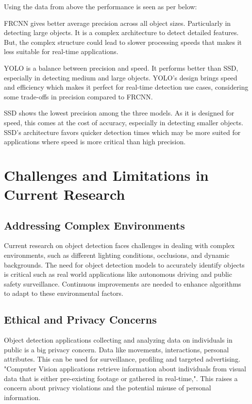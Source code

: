 \documentclass[11pt,journal,compsoc]{IEEEtran}
\begin{document}
Using the data from above the performance is seen as per below:

FRCNN gives better average precision across all object sizes. Particularly in detecting large objects. It is a complex architecture to detect detailed features. But, the complex structure could lead to slower processing speeds that makes it less suitable for real-time applications.

YOLO is a balance between precision and speed. It performs better than SSD, especially in detecting medium and large objects. YOLO's design brings speed and efficiency which makes it perfect for real-time detection use cases, considering some trade-offs in precision compared to FRCNN.

SSD shows the lowest precision among the three models. As it is designed for speed, this comes at the cost of accuracy, especially in detecting smaller objects. SSD's architecture favors quicker detection times which may be more suited for applications where speed is more critical than high precision.


\section{Challenges and Limitations in Current Research}
\subsection{Addressing Complex Environments}
Current research on object detection faces challenges in dealing with complex environments, such as different lighting conditions, occlusions, and dynamic backgrounds\cite{article_limitations}. The need for object detection models to accurately identify objects is critical such as real world applications like autonomous driving and public safety surveillance. Continuous improvements are needed to enhance algorithms to adapt to these environmental factors.

\subsection{Ethical and Privacy Concerns}
Object detection applications collecting and analyzing data on individuals in public is a big privacy concern. Data like movements, interactions, personal attributes. This can be used for surveillance, profiling and targeted advertising. "Computer Vision applications retrieve information about individuals from visual data that is either pre-existing footage or gathered in real-time,".\cite{waelen2023ethics} This raises a concern about privacy violations and the potential misuse of personal information.
\end{document}
